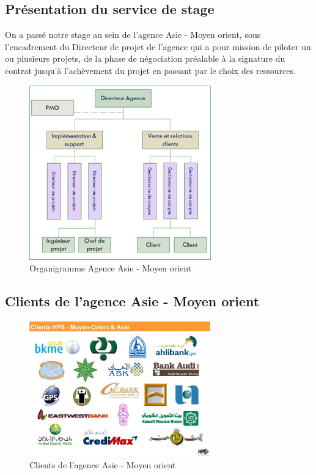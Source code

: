 \subsection{Présentation du service de stage}
On a passé notre stage au sein de l'agence Asie - Moyen orient, sous l'encadrement du Directeur de projet de l'agence qui a pour mission de piloter un ou plusieurs projets, de la phase de négociation préalable à la signature du contrat jusqu'à l'achèvement du projet en passant par le choix des ressources.
\newpage
\begin{figure}[h!]  
  \centering
    \includegraphics[width=0.7\textwidth]{chapitre1/Figures/AMAAF.png}
  \caption{Organigramme Agence Asie - Moyen orient}
\end{figure}
\subsection{Clients de l’agence Asie - Moyen orient}
\begin{figure}[h!]  
  \centering
    \includegraphics[width=0.7\textwidth]{chapitre1/Figures/clientMAAF.png}
  \caption{Clients de l’agence Asie - Moyen orient}
\end{figure}